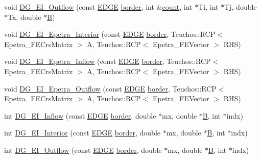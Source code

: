 \begin{DoxyCompactItemize}
\item 
void \hyperlink{classDG__Prob_a5aa1654fb60cabf97719e65ba9302cf4}{D\+G\+\_\+\+E\+I\+\_\+\+Outflow} (const \hyperlink{structEDGE}{E\+D\+GE} \hyperlink{classGeProb_a6c144ac05b601c5d6141c711edaaa775}{border}, int \&\hyperlink{classDG__Prob_a638611f0f0a04508f43ac7554bc8c7e2}{count}, int $\ast$Ti, int $\ast$Tj, double $\ast$Tx, double $\ast$\hyperlink{ASPFunctions_8cpp_a57d673f8d6833fb7a7aced326df10ca9}{B})
\item 
void \hyperlink{classDG__Prob_aa09b19ad56db0010779b0787d0edd2a5}{D\+G\+\_\+\+E\+I\+\_\+\+Epetra\+\_\+\+Interior} (const \hyperlink{structEDGE}{E\+D\+GE} \hyperlink{classGeProb_a6c144ac05b601c5d6141c711edaaa775}{border}, Teuchos\+::\+R\+CP$<$ Epetra\+\_\+\+F\+E\+Crs\+Matrix $>$ A, Teuchos\+::\+R\+CP$<$ Epetra\+\_\+\+F\+E\+Vector $>$ R\+HS)
\item 
void \hyperlink{classDG__Prob_a0c085b8fc3c827c37aa8733a2842a97f}{D\+G\+\_\+\+E\+I\+\_\+\+Epetra\+\_\+\+Inflow} (const \hyperlink{structEDGE}{E\+D\+GE} \hyperlink{classGeProb_a6c144ac05b601c5d6141c711edaaa775}{border}, Teuchos\+::\+R\+CP$<$ Epetra\+\_\+\+F\+E\+Crs\+Matrix $>$ A, Teuchos\+::\+R\+CP$<$ Epetra\+\_\+\+F\+E\+Vector $>$ R\+HS)
\item 
void \hyperlink{classDG__Prob_a7fa0c815d5707dbf3858feb3977f5ee5}{D\+G\+\_\+\+E\+I\+\_\+\+Epetra\+\_\+\+Outflow} (const \hyperlink{structEDGE}{E\+D\+GE} \hyperlink{classGeProb_a6c144ac05b601c5d6141c711edaaa775}{border}, Teuchos\+::\+R\+CP$<$ Epetra\+\_\+\+F\+E\+Crs\+Matrix $>$ A, Teuchos\+::\+R\+CP$<$ Epetra\+\_\+\+F\+E\+Vector $>$ R\+HS)
\item 
int \hyperlink{classDG__Prob_ae722c0b7a7d1bccc9dbc9d2333754b42}{D\+G\+\_\+\+E\+I\+\_\+\+Inflow} (const \hyperlink{structEDGE}{E\+D\+GE} \hyperlink{classGeProb_a6c144ac05b601c5d6141c711edaaa775}{border}, double $\ast$mx, double $\ast$\hyperlink{ASPFunctions_8cpp_a57d673f8d6833fb7a7aced326df10ca9}{B}, int $\ast$indx)
\item 
int \hyperlink{classDG__Prob_ac3054c910c2a6465c71f208b0e2b79ff}{D\+G\+\_\+\+E\+I\+\_\+\+Interior} (const \hyperlink{structEDGE}{E\+D\+GE} \hyperlink{classGeProb_a6c144ac05b601c5d6141c711edaaa775}{border}, double $\ast$mx, double $\ast$\hyperlink{ASPFunctions_8cpp_a57d673f8d6833fb7a7aced326df10ca9}{B}, int $\ast$indx)
\item 
int \hyperlink{classDG__Prob_a3e99ae33818db46884cd2683c741f36c}{D\+G\+\_\+\+E\+I\+\_\+\+Outflow} (const \hyperlink{structEDGE}{E\+D\+GE} \hyperlink{classGeProb_a6c144ac05b601c5d6141c711edaaa775}{border}, double $\ast$mx, double $\ast$\hyperlink{ASPFunctions_8cpp_a57d673f8d6833fb7a7aced326df10ca9}{B}, int $\ast$indx)

\end{DoxyCompactItemize}
